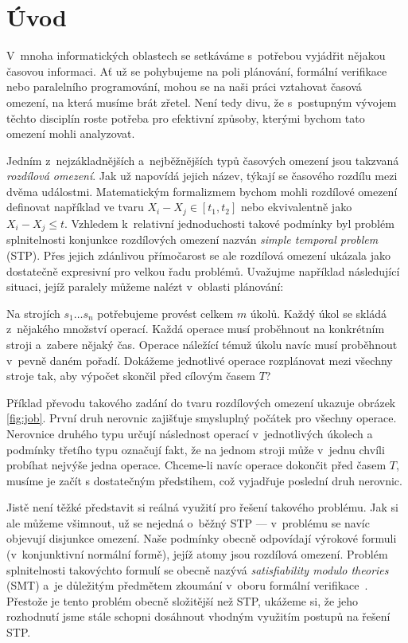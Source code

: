 \chapter*{Úvod}

V~mnoha informatických oblastech se setkáváme s~potřebou vyjádřit nějakou časovou informaci. Ať už se pohybujeme na poli plánování, formální verifikace nebo paralelního programování, mohou se na naši práci vztahovat časová omezení, na která musíme brát zřetel. Není tedy divu, že s~postupným vývojem těchto disciplín roste potřeba pro efektivní způsoby, kterými bychom tato omezení mohli analyzovat.

Jedním z~nejzákladnějších a~nejběžnějších typů časových omezení jsou takzvaná \emph{rozdílová omezení}. Jak už napovídá jejich název, týkají se časového rozdílu mezi dvěma událostmi. Matematickým formalizmem bychom mohli rozdílové omezení definovat například ve tvaru $X_i - X_j \in [t_1, t_2]$ nebo ekvivalentně jako $X_i - X_j \leq t$. Vzhledem k~relativní jednoduchosti takové podmínky byl problém splnitelnosti konjunkce rozdílových omezení nazván \emph{simple temporal problem} (STP). Přes jejich zdánlivou přímočarost se ale rozdílová omezení ukázala jako dostatečně expresivní pro velkou řadu problémů. Uvažujme například následující situaci, jejíž paralely můžeme nalézt v~oblasti plánování: 

\begin{center}
\begin{minipage}{\textwidth}
Na strojích $s_1 \dots s_n$ potřebujeme provést celkem $m$ úkolů. Každý úkol se skládá z~nějakého množství operací. Každá operace musí proběhnout na konkrétním stroji a~zabere nějaký čas. Operace náležící témuž úkolu navíc musí proběhnout v~pevně daném pořadí. Dokážeme jednotlivé operace rozplánovat mezi všechny stroje tak, aby výpočet skončil před cílovým časem $T$?
\end{minipage}
\end{center}

Příklad převodu takového zadání do tvaru rozdílových omezení ukazuje obrázek \ref{fig:job}. První druh nerovnic zajišťuje smysluplný počátek pro všechny operace. Nerovnice druhého typu určují následnost operací v~jednotlivých úkolech a podmínky třetího typu označují fakt, že na jednom stroji může v~jednu chvíli probíhat nejvýše jedna operace. Chceme-li navíc operace dokončit před časem $T$, musíme je začít s dostatečným předstihem, což vyjadřuje poslední druh nerovnic. 

Jistě není těžké představit si reálná využití pro řešení takového problému. Jak si ale můžeme všimnout, už se nejedná o~běžný STP --- v~problému se navíc objevují disjunkce omezení. Naše podmínky obecně odpovídají výrokové formuli (v~konjunktivní normální formě), jejíž atomy jsou rozdílová omezení. Problém splnitelnosti takovýchto formulí se obecně nazývá \emph{satisfiability modulo theories} (SMT) a~je důležitým předmětem zkoumání v~oboru formální verifikace~\cite{SMT}. Přestože je tento problém obecně složitější než STP, ukážeme si, že jeho rozhodnutí jsme stále schopni dosáhnout vhodným využitím postupů na řešení STP.

